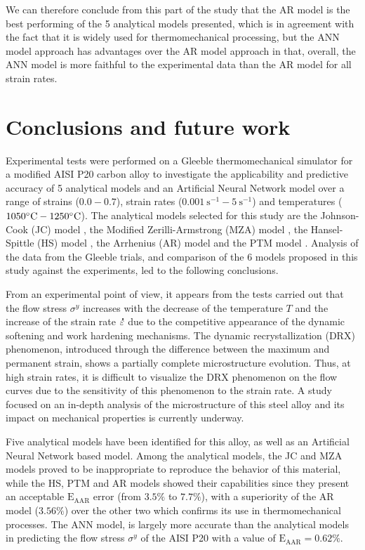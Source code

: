 \documentclass[twoside,english,1p,final,sort&compress]{elsarticle}
\theoremstyle{plain}
\DeclareRobustCommand{\mdot}[1]{\accentset{\mbox{\bfseries .}}{#1}}
\DeclareRobustCommand{\AARE}{\text{E}_\text{AAR}}
\DeclareRobustCommand{\ps}{\text{s}^{-1}}
\begin{document}
We can therefore conclude from this part of the study that the AR model is the best performing of the 5 analytical models presented, which is in agreement with the fact that it is widely used for thermomechanical processing, but the ANN model approach has advantages over the AR model approach in that, overall, the ANN model is more faithful to the experimental data than the AR model for all strain rates.

\section{Conclusions and future work\label{sec:Conclusion}}

Experimental tests were performed on a Gleeble thermomechanical simulator for a modified AISI P20 carbon alloy to investigate the applicability and predictive accuracy of 5 analytical models and an Artificial Neural Network model over a range of strains ($0.0-0.7$), strain rates ($0.001~\ps-5~\ps$) and temperatures ($1050\celsius-1250\celsius$).
The analytical models selected for this study are the Johnson-Cook (JC) model \cite{Johnson-1983}, the Modified Zerilli-Armstrong (MZA) model \cite{Samantaray-2009}, the Hansel-Spittle (HS) model \cite{Hensel-1978}, the Arrhenius (AR) model \cite{Sellars-1966} and the PTM model  \cite{TizeMha-2022}.
Analysis of the data from the Gleeble trials, and comparison of the 6 models proposed in this study against the experiments, led to the following conclusions.

From an experimental point of view, it appears from the tests carried out that the flow stress $\sigma^y$ increases with the decrease of the temperature $T$ and the increase of the strain rate $\mdot\varepsilon$ due to the competitive appearance of the dynamic softening and work hardening mechanisms.
The dynamic recrystallization (DRX) phenomenon, introduced through the difference between the maximum and permanent strain, shows a partially complete microstructure evolution.
Thus, at high strain rates, it is difficult to visualize the DRX phenomenon on the flow curves due to the sensitivity of this phenomenon to the strain rate.
A study focused on an in-depth analysis of the microstructure of this steel alloy and its impact on mechanical properties is currently underway.

Five analytical models have been identified for this alloy, as well as an Artificial Neural Network based model.
Among the analytical models, the JC and MZA models proved to be inappropriate to reproduce the behavior of this material, while the HS, PTM and AR models showed their capabilities since they present an acceptable $\AARE$ error (from $3.5\%$ to $7.7\%$), with a superiority of the AR model ($3.56\%$) over the other two which confirms its use in thermomechanical processes.
The ANN model, is largely more accurate than the analytical models in predicting the flow stress $\sigma^y$ of the AISI P20 with a value of $\AARE=0.62\%$.
\end{document}
